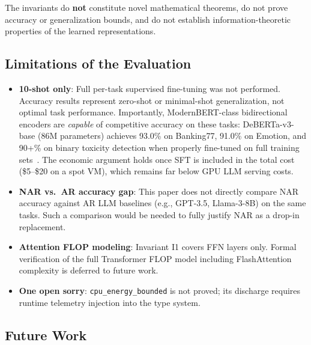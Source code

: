 \documentclass[10pt,journal,compsoc]{IEEEtran}
\theoremstyle{remark}
\begin{document}
The invariants do \textbf{not} constitute novel mathematical theorems, do not prove accuracy or generalization bounds, and do not establish information-theoretic properties of the learned representations.

\subsection{Limitations of the Evaluation}

\begin{itemize}
\item \textbf{10-shot only}: Full per-task supervised fine-tuning was not performed. Accuracy results represent zero-shot or minimal-shot generalization, not optimal task performance. Importantly, ModernBERT-class bidirectional encoders are \emph{capable} of competitive accuracy on these tasks: DeBERTa-v3-base (86M parameters) achieves 93.0\% on Banking77, 91.0\% on Emotion, and 90+\% on binary toxicity detection when properly fine-tuned on full training sets~\cite{he2021deberta}. The economic argument holds once SFT is included in the total cost (\$5--\$20 on a spot VM), which remains far below GPU LLM serving costs.
\item \textbf{NAR vs.\ AR accuracy gap}: This paper does not directly compare NAR accuracy against AR LLM baselines (e.g., GPT-3.5, Llama-3-8B) on the same tasks. Such a comparison would be needed to fully justify NAR as a drop-in replacement.
\item \textbf{Attention FLOP modeling}: Invariant I1 covers FFN layers only. Formal verification of the full Transformer FLOP model including FlashAttention complexity is deferred to future work.
\item \textbf{One open sorry}: \texttt{cpu\_energy\_bounded} is not proved; its discharge requires runtime telemetry injection into the type system.
\end{itemize}

\subsection{Future Work}
\end{document}
